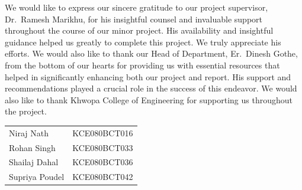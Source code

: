 
We would like to express our sincere gratitude to our project supervisor,
Dr.~Ramesh Marikhu, for his insightful counsel and invaluable support
throughout the course of our minor project. His availability and insightful
guidance helped us greatly to complete this project. We truly appreciate his
efforts. We would also like to thank our Head of Department, Er.~Dinesh Gothe,
from the bottom of our hearts for providing us with essential resources that
helped in significantly enhancing both our project and report. His support and
recommendations played a crucial role in the success of this endeavor. We would
also like to thank Khwopa College of Engineering for supporting us throughout
the project.

\vspace{1.5cm}

\noindent
\begin{tabular}{ll}
Niraj Nath      & KCE080BCT016 \\
Rohan Singh     & KCE080BCT033 \\
Shailaj Dahal   & KCE080BCT036 \\
Supriya Poudel  & KCE080BCT042 \\
\end{tabular}

\clearpage
